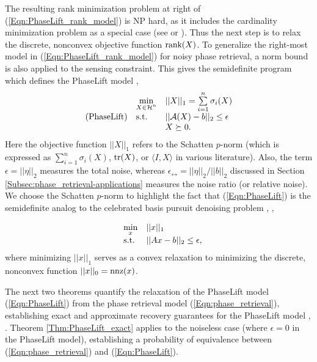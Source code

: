 The resulting rank minimization problem at right of (\ref{Eqn:PhaseLift_rank_model}) is NP hard, as it includes the cardinality minimization problem as a special case (see \cite{natarajan1995sparse} or  \cite{recht2010guaranteed}).  Thus the next step is to relax the discrete, nonconvex objective function $\textnormal{rank}(X)$.  To generalize the right-most model in (\ref{Eqn:PhaseLift_rank_model}) for noisy phase retrieval, a norm bound is also applied to the sensing constraint.  This gives the semidefinite program which defines the PhaseLift model \cite{DBLP:journals/siamis/CandesESV13}, \cite{candes2013phaselift}
\begin{equation} \label{Eqn:PhaseLift}
\begin{array}{lll}
	&	\min\limits_{\substack{X \in {\mathcal H}^n}}
		&	||X||_1 = \sum\limits_{\substack{i=1}}^{\substack{n}} \sigma_i(X)
			\\
\textnormal{(PhaseLift)}
	&	\textnormal{s.t.}
		& 	||{\mathcal A} (X) - b||_2 \leq \epsilon
			\\

	&
		&	X \succeq 0.

\end{array}
\end{equation}
Here the objective function $||X||_1$ refers to the Schatten $p$-norm (which is expressed as $\sum_{i=1}^n \sigma_i(X)$, $\mathrm{tr}(X)$, or $\langle I, X \rangle$ in various literature).  Also, the term $\epsilon = ||\eta||_2$ measures the total noise, whereas $\epsilon_\rel = ||\eta||_2 / ||b||_2$ discussed in Section \ref{Subsec:phase_retrieval-applications} measures the noise ratio (or relative noise).  We choose the Schatten $p$-norm to highlight the fact that (\ref{Eqn:PhaseLift}) is the semidefinite analog to the celebrated  basis pursuit denoising problem \cite{chen2001atomic}, \cite{candes2006stable},

\begin{equation}  			\label{Eqn:basis_pursuit}
\begin{array}{lll}
	&	\min\limits_{\substack{x}}
		&	||x||_1
			\\
	&	\textnormal{s.t.}
		&	||Ax-b||_2 \leq \epsilon,
\end{array}
\end{equation}
where minimizing $||x||_1$ serves as a convex relaxation to minimizing the discrete, nonconvex function $||x||_0 = \textnormal{nnz}(x)$.



The next two theorems quantify the relaxation of the PhaseLift model (\ref{Eqn:PhaseLift}) from the phase retrieval model (\ref{Eqn:phase_retrieval}), establishing exact and approximate recovery guarantees for the PhaseLift model \cite{candes2014solving}, \cite{candes2013phaselift}.  Theorem \ref{Thm:PhaseLift_exact} applies to the noiseless case (where $\epsilon = 0$ in the PhaseLift model), establishing a probability of equivalence between (\ref{Eqn:phase_retrieval}) and (\ref{Eqn:PhaseLift}).  


